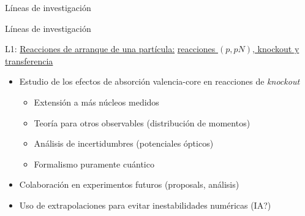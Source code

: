 \documentclass{beamer}
\begin{document}
\begin{frame}{Líneas de investigación}
\begin{center}
\end{center}
    
\end{frame}

\begin{frame}{Líneas de investigación} 

\large {}  L1: \underline{Reacciones de arranque de una partícula:} \underline{reacciones $(p, pN )$, knockout y transferencia}

\normalsize
    
\begin{itemize}
\item Estudio de los efectos de absorción valencia-core en reacciones de \textit{knockout}
\begin{itemize}
\item Extensión a más núcleos medidos
\item Teoría para otros observables (distribución de momentos)
\item Análisis de incertidumbres (potenciales ópticos)
\item Formalismo puramente cuántico
\end{itemize}

\item Colaboración en experimentos futuros (proposals, análisis)
\item Uso de extrapolaciones para evitar inestabilidades numéricas (IA?)
\end{itemize}    
    
\end{frame}
\end{document}
